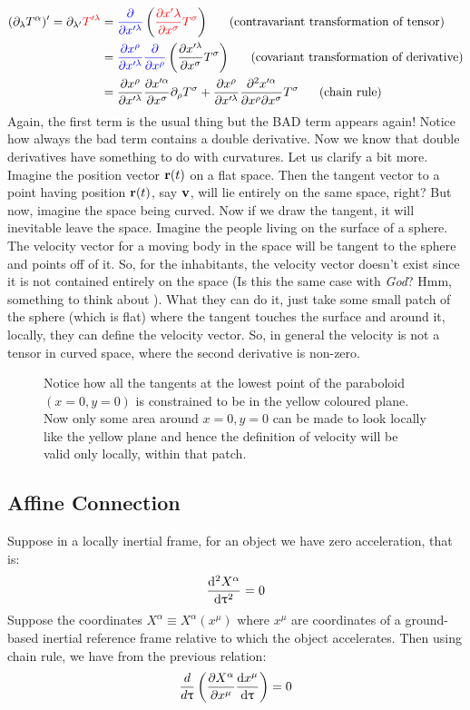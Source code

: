\begin{align*}
    (\partial_\lambda T^\alpha)' = \partial_{\lambda'}\mathcolor{red}{T'^\lambda}&= \mathcolor{blue}{\frac{\partial}{\partial x'^\lambda}}\brac{\mathcolor{red}{\pdv{x'\lambda}{x^\sigma}T^\sigma}} \quad \ \ (\text{contravariant transformation of tensor})\\
    &= \mathcolor{blue}{\pdv{x^\rho}{x'^\lambda}\frac{\partial}{\partial x^\rho}}\brac{{\pdv{x'^\lambda}{x^\sigma}T^\sigma}}\quad \ \ (\text{covariant transformation of derivative})\\
    &= \pdv{x^\rho}{x'^\lambda}\pdv{x'^\alpha}{x^\sigma}\partial_\rho T^\sigma + \pdv{x^\rho}{x'^\lambda}\pdv{x'^\alpha}{x^\rho}{x^\sigma}T^\sigma \quad \ \ (\text{chain rule})
\end{align*}
Again, the first term is the usual thing but the BAD term appears again! Notice how always the bad term contains a double derivative. Now we know that double derivatives have something to do with curvatures. Let us clarify a bit more.\\[0.3cm]
Imagine the position vector $\boldsymbol{\mathbf{r}}(t)$ on a flat space. Then the tangent vector to a point having position $\boldsymbol{\mathbf{r}}(t)$, say $\boldsymbol{\mathbf{v}}$, will lie entirely on the same space, right? But now, imagine the space being curved. Now if we draw the tangent, it will inevitable leave the space. Imagine the people living on the surface of a sphere. The velocity vector for a moving body in the space will be tangent to the sphere and points off of it. So, for the inhabitants, the velocity vector doesn't exist since it is not contained entirely on the space (Is this the same case with \textit{God}? Hmm, something to think about ). What they can do it, just take some small patch of the sphere (which is flat) where the tangent touches the surface and around it, locally, they can define the velocity vector. So, in general the velocity is not a tensor in curved space, where the second derivative is non-zero. 

\begin{figure}[H]
    \centering 
    
    \caption{Notice how all the tangents at the lowest point of the paraboloid $(x=0,y=0)$ is constrained to be in the yellow coloured plane. Now only some area around $x=0,y=0$ can be made to look locally like the yellow plane and hence the definition of velocity will be valid only locally, within that patch.   }
\end{figure}
\subsection{Affine Connection}
Suppose in a locally inertial frame, for an object we have zero acceleration, that is:
$$\dv[2]{X^\alpha}{\uptau} = 0$$
Suppose the coordinates $X^\alpha \equiv X^\alpha(x^\mu)$ where $x^\mu$ are coordinates of a ground-based inertial reference frame relative to which the object accelerates. Then using chain rule, we have from the previous relation:
$$\frac{d}{d\uptau}\left( \pdv{X^\alpha}{x^\mu}\dv{x^\mu}{\uptau} \right) = 0$$

